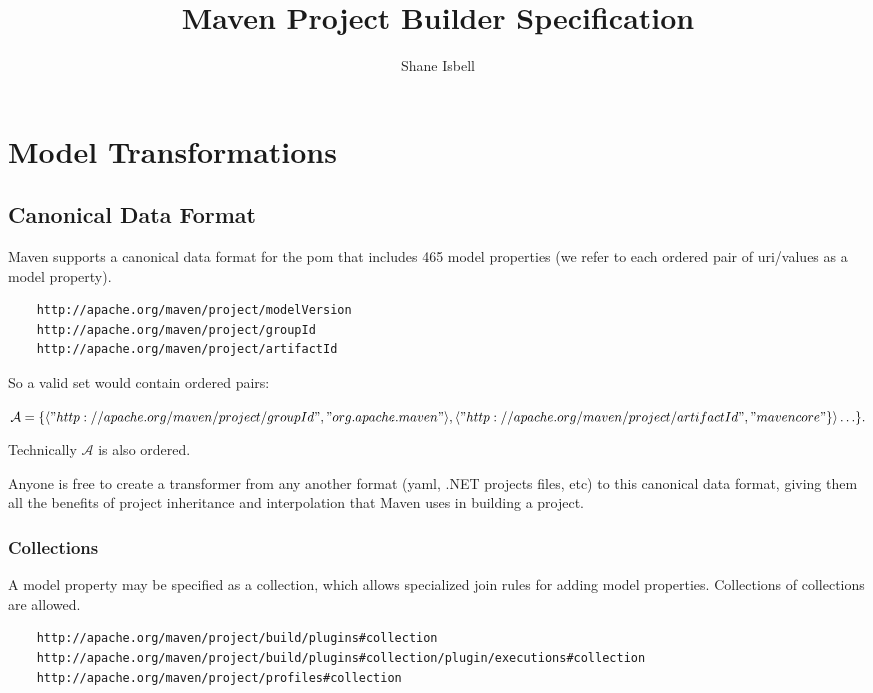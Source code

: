 \documentclass[12pt]{amsart}
\title{Maven Project Builder Specification}
\author{Shane Isbell}
\begin{document}
\maketitle
\tableofcontents
\section{Model Transformations}
\subsection{Canonical Data Format}
Maven supports a canonical data format for the pom that includes 465 model properties (we refer to each ordered pair of uri/values as a model property). 

\begin{verbatim}
	http://apache.org/maven/project/modelVersion
	http://apache.org/maven/project/groupId
	http://apache.org/maven/project/artifactId
\end{verbatim}

So a valid set would contain ordered pairs:

\begin{math}
	\mathcal{A}= \{\langle "http://apache.org/maven/project/groupId", "org.apache.maven"\rangle,   
	\langle "http://apache.org/maven/project/artifactId", "mavencore"\}\rangle \ldots\}.
\end{math}

Technically \begin{math}\mathcal{A}\end{math} is also ordered.

Anyone is free to create a transformer from any another format (yaml, .NET projects files, etc) to this canonical data format, giving them all the benefits of project inheritance and interpolation that Maven uses in building a project.

\subsubsection{Collections}
A model property may  be specified as a collection, which allows specialized join rules for adding model properties. Collections of collections are allowed.
\begin{verbatim}
	http://apache.org/maven/project/build/plugins#collection
	http://apache.org/maven/project/build/plugins#collection/plugin/executions#collection
	http://apache.org/maven/project/profiles#collection
\end{verbatim}
  
\end{document}
